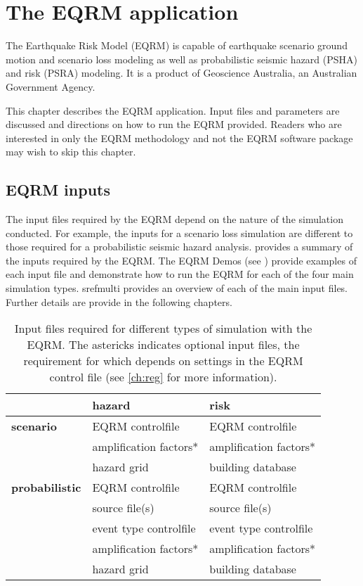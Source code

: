 \chapter{The EQRM application}
\label{ch:application}

The Earthquake Risk Model (EQRM) is capable of earthquake scenario
ground motion and scenario loss modeling as well as probabilistic
seismic hazard (PSHA) and risk (PSRA) modeling. It is a product of
Geoscience Australia, an Australian Government Agency.

This chapter describes the EQRM application. Input files and
parameters are discussed and directions on how to run the EQRM
provided. Readers who are interested in only the EQRM methodology
and not the EQRM software package may wish to skip this chapter.

\section{EQRM inputs}

The input files required by the EQRM depend on the nature of the
simulation conducted. For example, the inputs for a scenario loss
simulation are different to those required for a probabilistic
seismic hazard analysis.  provides a
summary of the inputs required by the EQRM. The EQRM Demos (see
) provide examples of each input file and
demonstrate how to run the EQRM for each of the four main simulation
types. srefmulti provides an overview of each of the main input
files. Further details are provide in the following chapters.

\begin{table}
\caption{Input files required for different types of simulation with
the EQRM. The astericks indicates optional input files, the
requirement for which depends on settings in the EQRM control file
(see \cref{ch:reg} for more information).}
\label{tab:input-overview} \centering
\begin{tabular}{|l|l|l|}
\hline
 & \textbf{hazard} & \textbf{risk} \\
\hline
\textbf{scenario} & EQRM controlfile & EQRM controlfile \\
  & amplification factors* & amplification factors* \\
  & hazard grid & building database \\
\hline
\textbf{probabilistic} & EQRM controlfile & EQRM controlfile\\
  & source file(s) & source file(s) \\
  & event type controlfile & event type controlfile \\
  & amplification factors* & amplification factors* \\
  & hazard grid & building database \\
\hline
\end{tabular}
\end{table}

